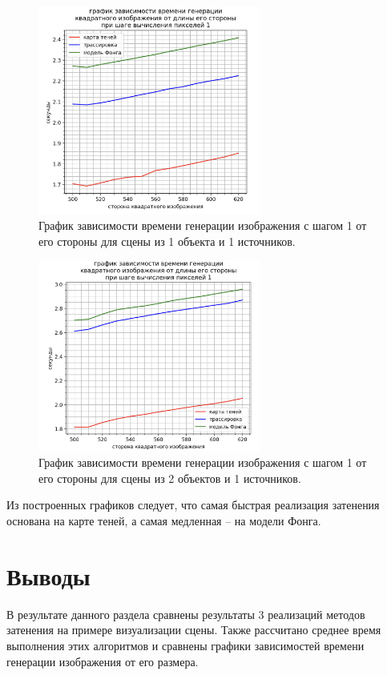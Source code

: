 \begin{figure}[H]
	\centering
	\includegraphics[width=0.65\textwidth]{img/1obj_1src.png}
	\caption{
        График зависимости времени генерации изображения с шагом 1 от его стороны
        для сцены из 1 объекта и 1 источников.
    }
	\label{fig:1src_1obj}
\end{figure}

\begin{figure}[H]
	\centering
	\includegraphics[width=0.65\textwidth]{img/1src_2obj.png}
	\caption{
        График зависимости времени генерации изображения с шагом 1 от его стороны
        для сцены из 2 объектов и 1 источников.
    }
	\label{fig:1src_2obj}
\end{figure}

Из построенных графиков следует, что самая быстрая
реализация затенения основана на карте теней,
а самая медленная -- на модели Фонга.

\section*{Выводы}
В результате данного раздела сравнены результаты
3 реализаций методов затенения на примере визуализации сцены.
Также рассчитано среднее время выполнения этих алгоритмов и сравнены
графики зависимостей времени генерации изображения от его размера.
